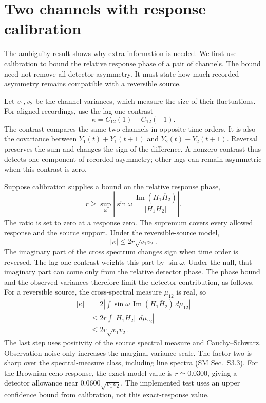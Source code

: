 \section{Two channels with response calibration}\label{sec:calibrated}
The ambiguity result shows why extra information is needed. We first use calibration to bound the relative response phase of a pair of channels. The bound need not remove all detector asymmetry. It must state how much recorded asymmetry remains compatible with a reversible source.

Let $v_1,v_2$ be the channel variances, which measure the size of their fluctuations. For aligned recordings, use the lag-one contrast
\begin{equation}
 \kappa=C_{12}(1)-C_{12}(-1).
 \label{eq:main-contrast}
\end{equation}
The contrast compares the same two channels in opposite time orders. It is also the covariance between $Y_1(t)+Y_1(t+1)$ and $Y_2(t)-Y_2(t+1)$. Reversal preserves the sum and changes the sign of the difference. A nonzero contrast thus detects one component of recorded asymmetry; other lags can remain asymmetric when this contrast is zero.

Suppose calibration supplies a bound on the relative response phase,
\begin{equation}
 r\ge\sup_\omega\left|\sin\omega\,
 \frac{\operatorname{Im}(H_1\overline H_2)}{|H_1H_2|}\right|.
 \label{eq:main-phase}
\end{equation}
The ratio is set to zero at a response zero. The supremum covers every allowed response and the source support. Under the reversible-source model,
\begin{equation}
 |\kappa|\le 2r\sqrt{v_1v_2}.\label{eq:main-tolerance}
\end{equation}
The imaginary part of the cross spectrum changes sign when time order is reversed. The lag-one contrast weights this part by $\sin\omega$. Under the null, that imaginary part can come only from the relative detector phase. The phase bound and the observed variances therefore limit the detector contribution, as follows. For a reversible source, the cross-spectral measure $\mu_{12}$ is real, so
\begin{align*}
 |\kappa|&=2\left|\int\sin\omega\,\operatorname{Im}(H_1\overline H_2)\,d\mu_{12}\right|\\
 &\le2r\int |H_1H_2|\,|d\mu_{12}|\\
 &\le2r\sqrt{v_1v_2}.
\end{align*}
The last step uses positivity of the source spectral measure and Cauchy--Schwarz. Observation noise only increases the marginal variance scale. The factor two is sharp over the spectral-measure class, including line spectra (SM Sec.~S3.3). For the Brownian echo response, the exact-model value is $r\simeq0.0300$, giving a detector allowance near $0.0600\sqrt{v_1v_2}$. The implemented test uses an upper confidence bound from calibration, not this exact-response value.

